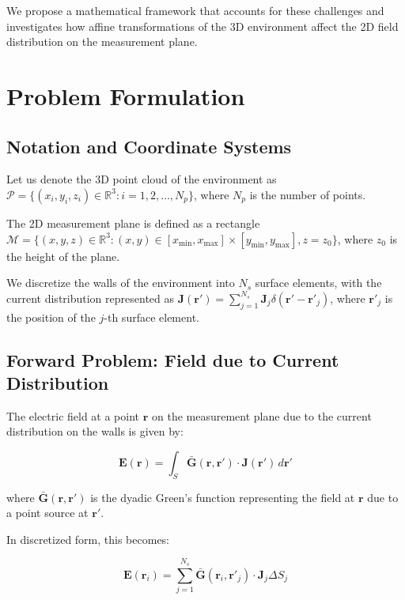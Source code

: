 \documentclass[12pt,a4paper]{article}
\begin{document}
We propose a mathematical framework that accounts for these challenges and investigates how affine transformations of the 3D environment affect the 2D field distribution on the measurement plane.

\section{Problem Formulation}

\subsection{Notation and Coordinate Systems}

Let us denote the 3D point cloud of the environment as $\mathcal{P} = \{(x_i, y_i, z_i) \in \mathbb{R}^3 : i = 1, 2, \ldots, N_p\}$, where $N_p$ is the number of points. 

The 2D measurement plane is defined as a rectangle $\mathcal{M} = \{(x, y, z) \in \mathbb{R}^3 : (x, y) \in [x_{\min}, x_{\max}] \times [y_{\min}, y_{\max}], z = z_0\}$, where $z_0$ is the height of the plane.

We discretize the walls of the environment into $N_s$ surface elements, with the current distribution represented as $\mathbf{J}(\mathbf{r}') = \sum_{j=1}^{N_s} \mathbf{J}_j \delta(\mathbf{r}' - \mathbf{r}'_j)$, where $\mathbf{r}'_j$ is the position of the $j$-th surface element.

\subsection{Forward Problem: Field due to Current Distribution}

The electric field at a point $\mathbf{r}$ on the measurement plane due to the current distribution on the walls is given by:

\begin{equation}
    \mathbf{E}(\mathbf{r}) = \int_S \bar{\mathbf{G}}(\mathbf{r}, \mathbf{r}') \cdot \mathbf{J}(\mathbf{r}') \, d\mathbf{r}'
\end{equation}

where $\bar{\mathbf{G}}(\mathbf{r}, \mathbf{r}')$ is the dyadic Green's function representing the field at $\mathbf{r}$ due to a point source at $\mathbf{r}'$.

In discretized form, this becomes:

\begin{equation}
    \mathbf{E}(\mathbf{r}_i) = \sum_{j=1}^{N_s} \bar{\mathbf{G}}(\mathbf{r}_i, \mathbf{r}'_j) \cdot \mathbf{J}_j \Delta S_j
\end{equation}
\end{document}
